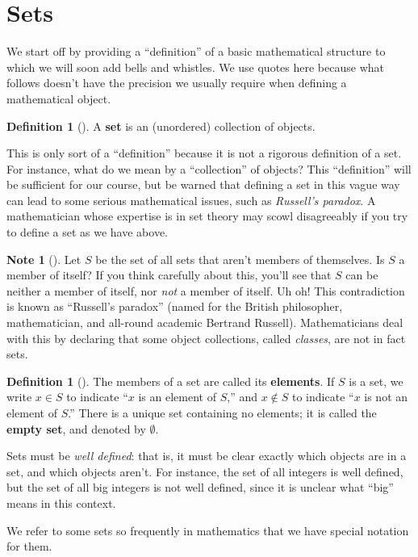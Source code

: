 \documentclass[10pt,]{book}
\newcommand{\terminology}[1]{\textbf{#1}}
\theoremstyle{plain}
\theoremstyle{definition}
\newtheorem{definition}[theorem]{Definition}
\theoremstyle{definition}
\newtheorem{note}[theorem]{Note}
\theoremstyle{definition}
\theoremstyle{definition}
\numberwithin{equation}{section}
\begin{document}
\section[{Sets}]{Sets}\label{section-1}
We start off by providing a ``definition'' of a basic mathematical structure to which we will soon add bells and whistles. We use quotes here because what follows doesn't have the precision we usually require when defining a mathematical object.%
\begin{definition}[{}]\label{definition-1}
A \terminology{set} is an (unordered) collection of objects.%
\end{definition}
This is only sort of  a ``definition'' because it is not a rigorous definition of a set. For instance, what do we mean by a ``collection'' of objects? This ``definition'' will be sufficient for our course, but be warned that defining a set in this vague way can lead to some serious mathematical issues, such as \emph{Russell's paradox}.  A mathematician whose expertise is in set theory may scowl disagreeably if you try to define a set as we have above.%
\begin{note}[]\label{note-1}
Let \(S\) be the set of all sets that aren't members of themselves.  Is \(S\) a member of itself? If you think carefully about this, you'll see that \(S\) can be neither a member of itself, nor \emph{not} a member of itself. Uh oh!  This contradiction is known as ``Russell's paradox'' (named for the British philosopher, mathematician, and all-round academic Bertrand Russell). Mathematicians deal with this by declaring that some object collections, called \emph{classes}, are not in fact sets.%
\end{note}
\begin{definition}[{}]\label{definition-2}
The members of a set are called its \terminology{elements}. If \(S\) is a set, we write \(x\in S\) to indicate ``\(x\) is an element of \(S\),'' and \(x \not\in S\) to indicate ``\(x\) is not an element of \(S\).'' There is a unique set containing no elements; it is called the \terminology{empty set}, and denoted by \(\emptyset\).%
\label{notation-1}
\label{notation-2}
\label{notation-3}
\end{definition}
Sets must be \emph{well defined}: that is, it must be clear exactly which objects are in a set, and which objects aren't. For instance, the set of all integers is well defined, but the set of all big integers is not well defined, since it is unclear what ``big'' means in this context.%
\par
We refer to some sets so frequently in mathematics that we have special notation for them.%
\end{document}
